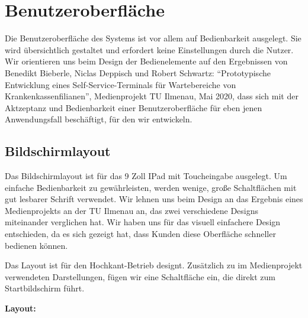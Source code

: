 \section{Benutzeroberfläche}
\vspace{1cm}

Die Benutzeroberfläche des Systems ist vor allem auf Bedienbarkeit ausgelegt. Sie wird übersichtlich gestaltet und erfordert keine Einstellungen durch die Nutzer. Wir orientieren uns beim Design der Bedienelemente auf den Ergebnissen von Benedikt Bieberle, Niclas Deppisch und Robert Schwartz: "`Prototypische Entwicklung eines Self-Service-Terminals für Wartebereiche von Krankenkassenfilianen"', Medienprojekt TU Ilmenau, Mai 2020, dass sich mit der Aktzeptanz und Bedienbarkeit einer Benutzeroberfläche für eben jenen Anwendungsfall beschäftigt, für den wir entwickeln.

\vspace{1,5cm}
\subsection{Bildschirmlayout}
\vspace{1cm}
Das Bildschirmlayout ist für das 9 Zoll IPad mit Toucheingabe ausgelegt. Um einfache Bedienbarkeit zu gewährleisten, werden wenige, große Schaltflächen mit gut lesbarer Schrift verwendet. Wir lehnen uns beim Design an das Ergebnis eines Medienprojekts an der TU Ilmenau an, das zwei verschiedene Designs miteinander verglichen hat. Wir haben uns für das visuell einfachere Design entschieden, da es sich gezeigt hat, dass Kunden diese Oberfläche schneller bedienen können.\par
\newpage
\noindent Das Layout ist für den Hochkant-Betrieb designt. Zusätzlich zu im Medienprojekt verwendeten Darstellungen, fügen wir eine Schaltfläche ein, die direkt zum Startbildschirm führt.\par
\vspace{1cm}
\textbf{Layout:}

